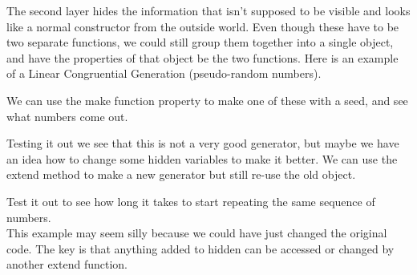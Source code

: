 The second layer hides the information that isn't supposed to be visible and looks like a normal constructor from the outside world. Even though these have to be two separate functions, we could still group them together into a single object, and have the properties of that object be the two functions. Here is an example of a Linear Congruential Generation (pseudo-random numbers).



We can use the make function property to make one of these with a seed, and see what numbers come out.


Testing it out we see that this is not a very good generator, but maybe we have an idea how to change some hidden variables to make it better. We can use the extend method to make a new generator but still re-use the old object.


Test it out to see how long it takes to start repeating the same sequence of numbers.\\

This example may seem silly because we could have just changed the original code. The key is that anything added to hidden can be accessed or changed by another extend function.
